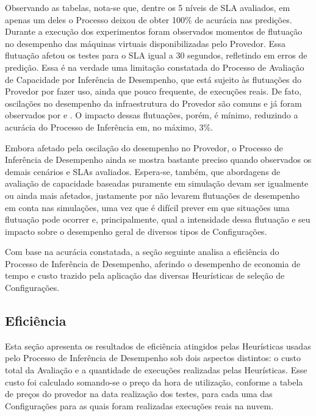 Observando as tabelas, nota-se que, dentre os 5 níveis de SLA avaliados, em apenas 
um deles o Processo deixou de obter 100\% de acurácia nas predições. Durante a
execução dos experimentos foram observados momentos de flutuação no desempenho
das máquinas virtuais disponibilizadas pelo Provedor. Essa flutuação afetou os
testes para o SLA igual a 30 segundos, refletindo em erros de predição. Essa é
na verdade uma limitação constatada do Processo de Avaliação de Capacidade por
Inferência de Desempenho, que está sujeito às flutuações do Provedor por fazer
uso, ainda que pouco frequente, de execuções reais. De fato, oscilações no 
desempenho da infraestrutura do Provedor são comuns e já foram observados por 
\cite{iosup2011performance} e \cite{cunhaavalia}. O impacto dessas flutuações, 
porém, é mínimo, reduzindo a acurácia do Processo de Inferência em, no máximo,
3\%.

Embora afetado pela oscilação do desempenho no Provedor, o Processo de Inferência
de Desempenho ainda se mostra bastante preciso quando observados os demais 
cenários e SLAs avaliados. Espera-se, também, que abordagens de avaliação de
capacidade baseadas puramente em simulação devam ser igualmente ou ainda mais 
afetados, justamente por não levarem flutuações de desempenho em conta nas 
simulações, uma vez que é difícil prever em que situações uma flutuação pode 
ocorrer e, principalmente, qual a intensidade dessa flutuação e seu impacto sobre 
o desempenho geral de diversos tipos de Configurações.   

Com base na acurácia constatada, a seção seguinte analisa a eficiência do Processo
de Inferência de Desempenho, aferindo o desempenho de economia de tempo e custo
trazido pela aplicação das diversas Heurísticas de seleção de Configurações. 

\subsection{Eficiência}
\label{subsec:resultados_eficiencia}
Esta seção apresenta os resultados de eficiência atingidos pelas Heurísticas usadas 
pelo Processo de Inferência de Desempenho sob dois aspectos distintos: o custo 
total da Avaliação e a quantidade de execuções realizadas pelas Heurísticas. Esse 
custo foi calculado somando-se o preço da hora de utilização, conforme a tabela 
de preços do provedor na data realização dos testes, para cada uma das Configurações 
para as quais foram realizadas execuções reais na nuvem. 

